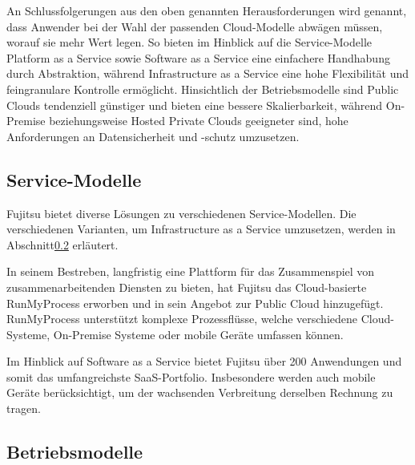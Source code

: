 
An Schlussfolgerungen aus den oben genannten Herausforderungen wird genannt, dass Anwender bei der Wahl der passenden Cloud-Modelle abwägen müssen, worauf sie mehr Wert legen. 
So bieten im Hinblick auf die Service-Modelle Platform as a Service sowie Software as a Service eine einfachere Handhabung durch Abstraktion, während Infrastructure as a Service eine hohe Flexibilität und feingranulare Kontrolle ermöglicht. 
Hinsichtlich der Betriebsmodelle sind Public Clouds tendenziell günstiger und bieten eine bessere Skalierbarkeit, während On-Premise beziehungsweise Hosted Private Clouds geeigneter sind, hohe Anforderungen an Datensicherheit und -schutz umzusetzen.

\subsection{Service-Modelle}
\label{sec_fujitsu_delivery}

Fujitsu bietet diverse Lösungen zu verschiedenen Service-Modellen. 
Die verschiedenen Varianten, um Infrastructure as a Service umzusetzen, werden in Abschnitt\ref{sec_fujitsu_deployment} erläutert.

In seinem Bestreben, langfristig eine Plattform für das Zusammenspiel von zusammenarbeitenden Diensten zu bieten, hat Fujitsu das Cloud-basierte RunMyProcess erworben und in sein Angebot zur Public Cloud hinzugefügt\cite{fujitsuPaaS}. RunMyProcess unterstützt komplexe Prozessflüsse, welche verschiedene Cloud-Systeme, On-Premise Systeme oder mobile Geräte umfassen können.

Im Hinblick auf Software as a Service bietet Fujitsu über 200 Anwendungen und somit das umfangreichste SaaS-Portfolio\cite{fujitsuSaaS}. 
Insbesondere werden auch mobile Geräte berücksichtigt, um der wachsenden Verbreitung derselben Rechnung zu tragen.

\subsection{Betriebsmodelle}
\label{sec_fujitsu_deployment}


